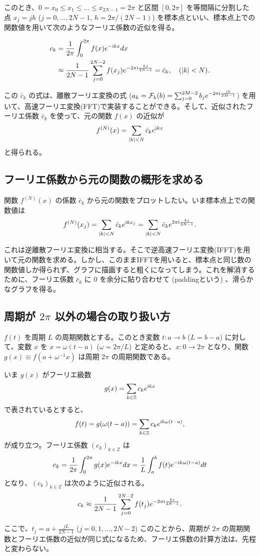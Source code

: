 このとき、$0 = x_0\le x_1\le \dots \le x_{2N-1}=2\pi$ と区間 $[0,2\pi]$ を等間隔に分割した点 $x_j = jh$ ($j = 0,\dots,2N-1$, $h=2\pi/(2N-1)$) を標本点といい、標本点上での関数値を用いて次のようなフーリエ係数の近似を得る。

\begin{align*}
c_k &= \frac{1}{2\pi}\int_0^{2\pi}f(x)e^{-\mathrm{i} k x}dx \\
& \approx \frac1{2N-1}\sum_{j=0}^{2N-2} f(x_j) e^{-2\pi \mathrm{i}\frac{kj}{2N-1}}=\bar{c}_k,\quad (|k|<N).
\end{align*}

この $\bar{c}_k$ の式は、離散フーリエ変換の式 ($ a_k = \mathcal{F}_k(b) = \sum_{j=0}^{2M-2}b_j e^{-2\pi \mathrm{i} \frac{jk}{2M-1}}$) を用いて、高速フーリエ変換(FFT)で実装することができる。そして、近似されたフーリエ係数 $\bar{c}_k$ を使って、元の関数 $f(x)$ の近似が
$$
f^{(N)}(x) = \sum_{|k|<N} \bar{c}_k e^{\mathrm{i} k x}
$$
と得られる。

\subsection{フーリエ係数から元の関数の概形を求める}

関数 $f^{(N)}(x)$ の係数 $\bar{c}_k$ から元の関数をプロットしたい。いま標本点上での関数値は
$$
f^{(N)}(x_j) = \sum_{|k|<N} \bar{c}_k e^{\mathrm{i} k x_j} = \sum_{|k|<N} \bar{c}_k e^{2\pi\mathrm{i} \frac{kj}{2N-1}}.
$$

これは逆離散フーリエ変換に相当する。そこで逆高速フーリエ変換(IFFT)を用いて元の関数を求める。しかし、このままIFFTを用いると、標本点と同じ数の関数値しか得られず、グラフに描画すると粗くになってしまう。これを解消するために、フーリエ係数 $\bar{c}_k$ に $0$ を余分に貼り合わせて (paddingという) 、滑らかなグラフを得る。

\subsection{周期が $2\pi$ 以外の場合の取り扱い方}

$f(t)$ を周期 $L$ の周期関数とする。このとき変数 $t:a\to b$ ($L=b-a$) に対して、変数 $x$ を $x = \omega(t-a)$ ($\omega = 2\pi/L$) と定めると、$x:0\to 2\pi$ となり、関数 $g(x)\equiv f(a + \omega^{-1} x)$ は周期 $2\pi$ の周期関数である。

いま $g(x)$ がフーリエ級数
$$
g(x) = \sum_{k \in \mathbb{Z}} c_k e^{\mathrm{i} k x}
$$
で表されているとすると、
$$
f(t) = g(\omega (t-a)) = \sum_{k \in \mathbb{Z}} c_k e^{\im k \omega (t-a)},%
$$
が成り立つ。フーリエ係数 $(c_k)_{k\in\mathbb{Z}}$ は
$$
c_k  = \frac{1}{2 \pi} \int_0 ^{2\pi} g(x) e^{-\mathrm{i} k x} dx = \frac{1}{L} \int_a ^b f(t) e^{-\mathrm{i} k \omega (t-a)} dt
$$
となり、$(c_k)_{k\in\mathbb{Z}}$ は次のように近似される。
$$
c_k \approx \frac{1}{2N-1} \sum_{j=0}^{2N-2} f(t_j) e^{-2 \pi \mathrm{i} \frac{kj}{2N-1}}.
$$

ここで、$t_j = a + \frac{jL}{2N-1}$ ($j=0,1,\dots,2N-2$) このことから、周期が $2\pi$ の周期関数とフーリエ係数の近似が同じ式になるため、フーリエ係数の計算方法は、先程と変わらない。

%